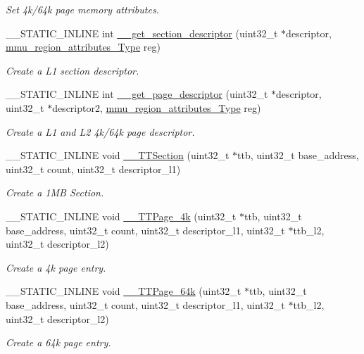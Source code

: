 \begin{DoxyCompactItemize}
\begin{DoxyCompactList}\small\item\em Set 4k/64k page memory attributes. \end{DoxyCompactList}\item 
\+\_\+\+\_\+\+S\+T\+A\+T\+I\+C\+\_\+\+I\+N\+L\+I\+NE int \hyperlink{group__MMU__Functions_gaba0a8d570464881118b1594d32237547}{\+\_\+\+\_\+get\+\_\+section\+\_\+descriptor} (uint32\+\_\+t $\ast$descriptor, \hyperlink{structRegionStruct}{mmu\+\_\+region\+\_\+attributes\+\_\+\+Type} reg)
\begin{DoxyCompactList}\small\item\em Create a L1 section descriptor. \end{DoxyCompactList}\item 
\+\_\+\+\_\+\+S\+T\+A\+T\+I\+C\+\_\+\+I\+N\+L\+I\+NE int \hyperlink{group__MMU__Functions_ga8ebe9d61b0b1e139068fd24e61f042b0}{\+\_\+\+\_\+get\+\_\+page\+\_\+descriptor} (uint32\+\_\+t $\ast$descriptor, uint32\+\_\+t $\ast$descriptor2, \hyperlink{structRegionStruct}{mmu\+\_\+region\+\_\+attributes\+\_\+\+Type} reg)
\begin{DoxyCompactList}\small\item\em Create a L1 and L2 4k/64k page descriptor. \end{DoxyCompactList}\item 
\+\_\+\+\_\+\+S\+T\+A\+T\+I\+C\+\_\+\+I\+N\+L\+I\+NE void \hyperlink{group__MMU__Functions_gafb0322c3afe9d9b67411eb1e5d093d2e}{\+\_\+\+\_\+\+T\+T\+Section} (uint32\+\_\+t $\ast$ttb, uint32\+\_\+t base\+\_\+address, uint32\+\_\+t count, uint32\+\_\+t descriptor\+\_\+l1)
\begin{DoxyCompactList}\small\item\em Create a 1\+MB Section. \end{DoxyCompactList}\item 
\+\_\+\+\_\+\+S\+T\+A\+T\+I\+C\+\_\+\+I\+N\+L\+I\+NE void \hyperlink{group__MMU__Functions_gab749bcf38edf77ab4112682e0e34834c}{\+\_\+\+\_\+\+T\+T\+Page\+\_\+4k} (uint32\+\_\+t $\ast$ttb, uint32\+\_\+t base\+\_\+address, uint32\+\_\+t count, uint32\+\_\+t descriptor\+\_\+l1, uint32\+\_\+t $\ast$ttb\+\_\+l2, uint32\+\_\+t descriptor\+\_\+l2)
\begin{DoxyCompactList}\small\item\em Create a 4k page entry. \end{DoxyCompactList}\item 
\+\_\+\+\_\+\+S\+T\+A\+T\+I\+C\+\_\+\+I\+N\+L\+I\+NE void \hyperlink{group__MMU__Functions_gacf942453d586ba20dd49c7d7d2e073a3}{\+\_\+\+\_\+\+T\+T\+Page\+\_\+64k} (uint32\+\_\+t $\ast$ttb, uint32\+\_\+t base\+\_\+address, uint32\+\_\+t count, uint32\+\_\+t descriptor\+\_\+l1, uint32\+\_\+t $\ast$ttb\+\_\+l2, uint32\+\_\+t descriptor\+\_\+l2)
\begin{DoxyCompactList}\small\item\em Create a 64k page entry. \end{DoxyCompactList}\end{DoxyCompactItemize}



